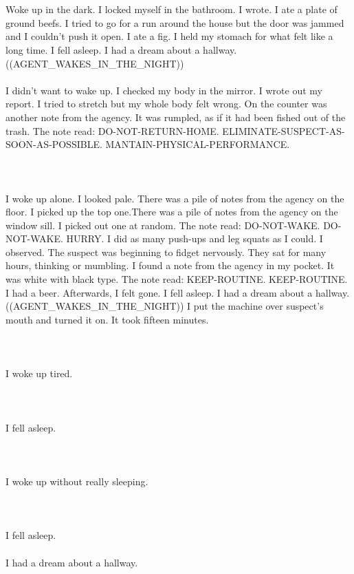 \documentclass{article}
\begin{document}
    \section{}
    Woke up in the dark. I locked myself in the bathroom. I wrote. I ate a plate of ground beefs. I tried to go for a run around the house but the door was jammed and I couldn't push it open. I ate a fig. I held my stomach for what felt like a long time. I fell asleep. I had a dream about a hallway. ((AGENT_WAKES_IN_THE_NIGHT)) \\\\I didn't want to wake up. I checked my body in the mirror. I wrote out my report. I tried to stretch but my whole body felt wrong. On the counter was another note from the agency. It was rumpled, as if it had been fished out of the trash. The note read: DO-NOT-RETURN-HOME. ELIMINATE-SUSPECT-AS-SOON-AS-POSSIBLE. MANTAIN-PHYSICAL-PERFORMANCE. \\\\
    \newpage
    
    \section{}
    I woke up alone. I looked pale. There was a pile of notes from the agency on the floor. I picked up the top one.There was a pile of notes from the agency on the window sill. I picked out one at random. The note read: DO-NOT-WAKE. DO-NOT-WAKE. HURRY. I did as many push-ups and leg squats as I could. I observed. The suspect was beginning to fidget nervously. They sat for many hours, thinking or mumbling. I found a note from the agency in my pocket. It was white with black type. The note read: KEEP-ROUTINE. KEEP-ROUTINE. I had a beer. Afterwards, I felt gone. I fell asleep. I had a dream about a hallway. ((AGENT_WAKES_IN_THE_NIGHT)) I put the machine over suspect's mouth and turned it on. It took fifteen minutes. \\\\
    \newpage
    
    \section{}
    I woke up tired.\\\\ 
    \newpage
    
    \section{}
    I fell asleep.\\\\ 
    \newpage
    
    \section{}
    I woke up without really sleeping.\\\\ 
    \newpage
    
    \section{}
    I fell asleep.\\\\I had a dream about a hallway.\\\\ 
    \newpage
    
    
\end{document}
